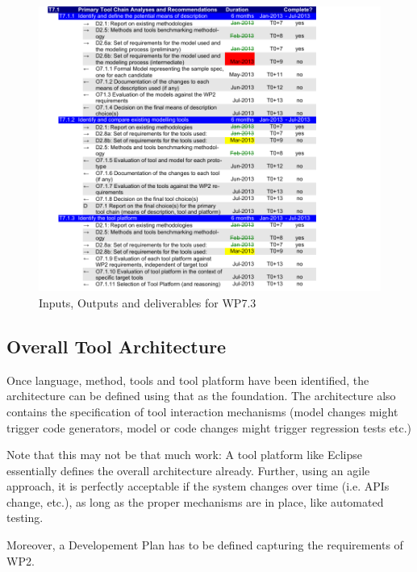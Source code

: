 \documentclass{template/openetcs_article}
\begin{document}
\begin{figure}[!ht]
	\begin{center}
	\includegraphics[width=\textwidth,page=3]{project_plan/WP7_Project_Management.pdf}
	\caption{Inputs, Outputs and deliverables for WP7.3}
	\label{fig:wrspm}
	\end{center}
\end{figure}


\subsection{Overall Tool Architecture}


Once language, method, tools and tool platform have been identified, the architecture can be defined using that as the foundation.  The architecture also contains the specification of tool interaction mechanisms (model changes might trigger code generators, model or code changes might trigger regression tests etc.) 

Note that this may not be that much work:  A tool platform like Eclipse essentially defines the overall architecture already.  Further, using an agile approach, it is perfectly acceptable if the system changes over time (i.e. APIs change, etc.), as long as the proper mechanisms are in place, like automated testing.

Moreover, a Developement Plan has to be defined capturing the requirements of WP2.
\end{document}
